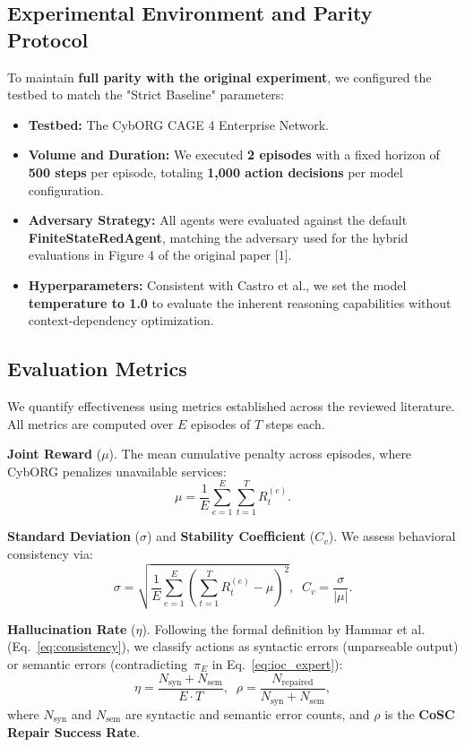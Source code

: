 \documentclass[letterpaper, 10 pt, conference]{ieeeconf}
\begin{document}
\subsection{Experimental Environment and Parity Protocol}
To maintain \textbf{full parity with the original experiment}, we configured the testbed to match the "Strict Baseline" parameters:
\begin{itemize}
    \item \textbf{Testbed:} The CybORG CAGE 4 Enterprise Network.
    \item \textbf{Volume and Duration:} We executed \textbf{2 episodes} with a fixed horizon of \textbf{500 steps} per episode, totaling \textbf{1,000 action decisions} per model configuration.
    \item \textbf{Adversary Strategy:} All agents were evaluated against the default \textbf{FiniteStateRedAgent}, matching the adversary used for the hybrid evaluations in Figure 4 of the original paper [1].
    \item \textbf{Hyperparameters:} Consistent with Castro et al., we set the model \textbf{temperature to 1.0} to evaluate the inherent reasoning capabilities without context-dependency optimization.
\end{itemize}

\subsection{Evaluation Metrics}
We quantify effectiveness using metrics established across the reviewed literature. All metrics are computed over $E$ episodes of $T$ steps each.

\textbf{Joint Reward} ($\mu$). The mean cumulative penalty across episodes, where CybORG penalizes unavailable services:
\begin{equation}
\label{eq:mu}
  \mu = \frac{1}{E}\sum_{e=1}^{E}\sum_{t=1}^{T} R_t^{(e)}.
\end{equation}

\textbf{Standard Deviation} ($\sigma$) and \textbf{Stability Coefficient} ($C_v$). We assess behavioral consistency via:
\begin{equation}
\label{eq:sigma}
  \sigma = \sqrt{\frac{1}{E}\sum_{e=1}^{E}\!\left(\sum_{t=1}^{T} R_t^{(e)} - \mu\right)^{\!2}},
  \;\; C_v = \frac{\sigma}{|\mu|}.
\end{equation}

\textbf{Hallucination Rate} ($\eta$). Following the formal definition by Hammar et al.~\cite{arXiv:2602.05279} (Eq.~\ref{eq:consistency}), we classify actions as syntactic errors (unparseable output) or semantic errors (contradicting~$\pi_E$ in Eq.~\ref{eq:ioc_expert}):
\begin{equation}
\label{eq:eta}
  \eta = \frac{N_{\text{syn}} + N_{\text{sem}}}{E \cdot T}, \;\;
  \rho = \frac{N_{\text{repaired}}}{N_{\text{syn}} + N_{\text{sem}}},
\end{equation}
where $N_{\text{syn}}$ and $N_{\text{sem}}$ are syntactic and semantic
error counts, and $\rho$ is the \textbf{CoSC Repair Success Rate}.
\end{document}
